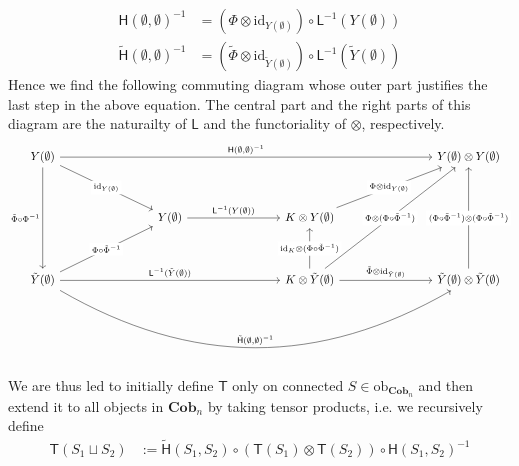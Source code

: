 \begin{align*}
  \mathsf{H}(\emptyset,\emptyset)^{-1}
  &=
  (\Phi \otimes \mathrm{id}_{Y(\emptyset)})
  \circ
  \mathsf{L}^{-1}(Y(\emptyset))
  \\
  \tilde{\mathsf{H}}(\emptyset,\emptyset)^{-1}
  &=
  (\tilde{\Phi} \otimes \mathrm{id}_{\tilde{Y}(\emptyset)})
  \circ
  \mathsf{L}^{-1}(\tilde{Y}(\emptyset))
\end{align*}
Hence we find the following commuting diagram whose outer part justifies the last step in the above equation. The central part and the right parts of this diagram are the naturailty of $\mathsf{L}$ and the functoriality of $\otimes$, respectively.
\begin{equation*}
\begin{tikzcd}[row sep=3.5em,column sep=8em]
  Y(\emptyset)
  \ar{rrr}{\mathsf{H}(\emptyset,\emptyset)^{-1}}
  \ar{rd}[description]{\mathrm{id}_{Y(\emptyset)}}
  \ar[swap]{dd}{\tilde{\Phi} \circ \Phi^{-1}}
  &
  &
  &
  Y(\emptyset)
  \otimes
  Y(\emptyset)
  \\
  &
  Y(\emptyset)
  \ar{r}{\mathsf{L}^{-1}(Y(\emptyset))}
  &
  K
  \otimes
  Y(\emptyset)
  \ar{ur}[description]{\Phi \otimes \mathrm{id}_{Y(\emptyset)}}
  &
  \\
  \tilde{Y}(\emptyset)
  \ar{ur}[description]{\Phi \circ \tilde{\Phi}^{-1}}
  \ar{rr}{\mathsf{L}^{-1}(\tilde{Y}(\emptyset))}
  \ar[bend right]{rrr}{\tilde{\mathsf{H}}(\emptyset,\emptyset)^{-1}}
  &
  &
  K
  \otimes
  \tilde{Y}(\emptyset)
  \ar{u}[description]{\mathrm{id}_{K} \otimes (\Phi \circ \tilde{\Phi}^{-1})}
  \ar{uur}[description]{\Phi \otimes (\Phi \circ \tilde{\Phi}^{-1})}
  \ar{r}{\tilde{\Phi} \otimes \mathrm{id}_{\tilde{Y}(\emptyset)}}
  &
  \tilde{Y}(\emptyset)
  \otimes
  \tilde{Y}(\emptyset)
  \ar{uu}[description]{(\Phi \circ \tilde{\Phi}^{-1}) \otimes (\Phi \circ \tilde{\Phi}^{-1})}
\end{tikzcd}
\end{equation*}
We are thus led to initially define $\mathsf{T}$ only on connected $S \in \mathrm{ob}_{\mathbf{Cob}_{n}}$ and then extend it to all objects in $\mathbf{Cob}_{n}$ by taking tensor products, i.e. we recursively define
\begin{align*}
  \mathsf{T}(S_{1} \sqcup S_{2})
  &:=
  \tilde{\mathsf{H}}(S_{1},S_{2})
  \circ
  \left(
    \mathsf{T}(S_{1})
    \otimes
    \mathsf{T}(S_{2})
  \right)
  \circ
  \mathsf{H}(S_{1},S_{2})^{-1}
\end{align*}
